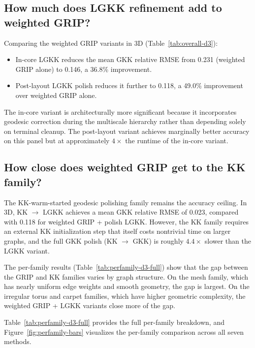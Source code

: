 \documentclass[11pt,twocolumn]{article}
\begin{document}
\subsection{How much does LGKK refinement add to weighted GRIP?}

Comparing the weighted GRIP variants in 3D (Table~\ref{tab:overall-d3}):

\begin{itemize}
\item In-core LGKK reduces the mean GKK relative RMSE from 0.231
  (weighted GRIP alone) to 0.146, a 36.8\% improvement.
\item Post-layout LGKK polish reduces it further to 0.118, a 49.0\%
  improvement over weighted GRIP alone.
\end{itemize}

The in-core variant is architecturally more significant because it
incorporates geodesic correction during the multiscale hierarchy rather
than depending solely on terminal cleanup.  The post-layout variant
achieves marginally better accuracy on this panel but at approximately
$4\times$ the runtime of the in-core variant.

\subsection{How close does weighted GRIP get to the KK family?}

The KK-warm-started geodesic polishing family remains the accuracy
ceiling.  In 3D, KK $\to$ LGKK achieves a mean GKK relative RMSE of
0.023, compared with 0.118 for weighted GRIP + polish LGKK.  However,
the KK family requires an external KK initialization step that itself
costs nontrivial time on larger graphs, and the full GKK polish
(KK $\to$ GKK) is roughly $4.4\times$ slower than the LGKK variant.

The per-family results (Table~\ref{tab:perfamily-d3-full}) show that the gap
between the GRIP and KK families varies by graph structure.  On the mesh
family, which has nearly uniform edge weights and smooth geometry, the
gap is largest.  On the irregular torus and carpet families, which have
higher geometric complexity, the weighted GRIP + LGKK variants close
more of the gap.

Table~\ref{tab:perfamily-d3-full} provides the full per-family
breakdown, and Figure~\ref{fig:perfamily-bars} visualizes the
per-family comparison across all seven methods.
\end{document}

